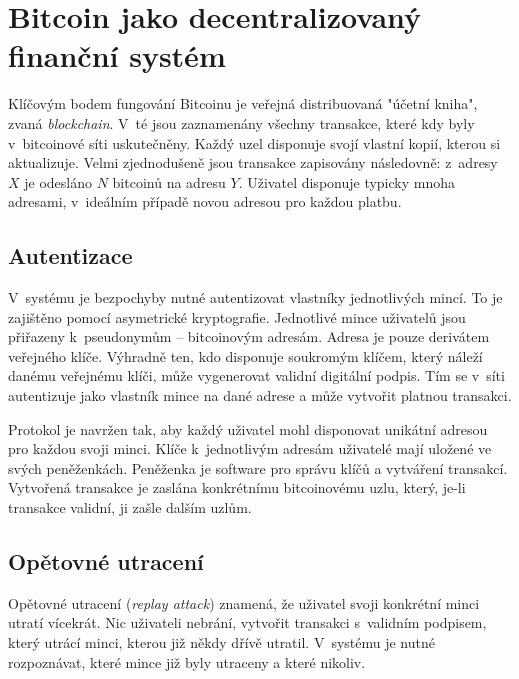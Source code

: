 
\section{Bitcoin jako decentralizovaný finanční systém}
\label{sec_bitcoin}

Klíčovým bodem fungování Bitcoinu je veřejná distribuovaná "účetní kniha", zvaná \textit{blockchain}. V~té jsou zaznamenány všechny transakce, které kdy byly v~bitcoinové síti uskutečněny. Každý uzel disponuje svojí vlastní kopií, kterou si aktualizuje. Velmi zjednodušeně jsou transakce zapisovány následovně: z~adresy $X$ je odesláno $N$ bitcoinů na adresu $Y$. Uživatel disponuje typicky mnoha adresami, v~ideálním případě novou adresou pro každou platbu.


\subsection{Autentizace}
\label{sec_bitcoin_autentizace}

V~systému je bezpochyby nutné autentizovat vlastníky jednotlivých mincí. To je zajištěno pomocí asymetrické kryptografie. Jednotlivé mince uživatelů jsou přiřazeny k~pseudonymům -- bitcoinovým adresám. Adresa je pouze derivátem veřejného klíče. Výhradně ten, kdo disponuje soukromým klíčem, který náleží danému veřejnému klíči, může vygenerovat validní digitální podpis. Tím se v~síti autentizuje jako vlastník mince na dané adrese a může vytvořit platnou transakci.

Protokol je navržen tak, aby každý uživatel mohl disponovat unikátní adresou pro každou svoji minci. Klíče k~jednotlivým adresám uživatelé mají uložené ve svých peněženkách. Peněženka je software pro správu klíčů a vytváření transakcí. Vytvořená transakce je zaslána konkrétnímu bitcoinovému uzlu, který, je-li transakce validní, ji zašle dalším uzlům.


\subsection{Opětovné utracení}
\label{sec_bitcoin_opetovne_utraceni}

Opětovné utracení (\textit{replay attack}) znamená, že uživatel svoji konkrétní minci utratí vícekrát. Nic uživateli nebrání, vytvořit transakci s~validním podpisem, který utrácí minci, kterou již někdy dřívě utratil. V~systému je nutné rozpoznávat, které mince již byly utraceny a které nikoliv.

